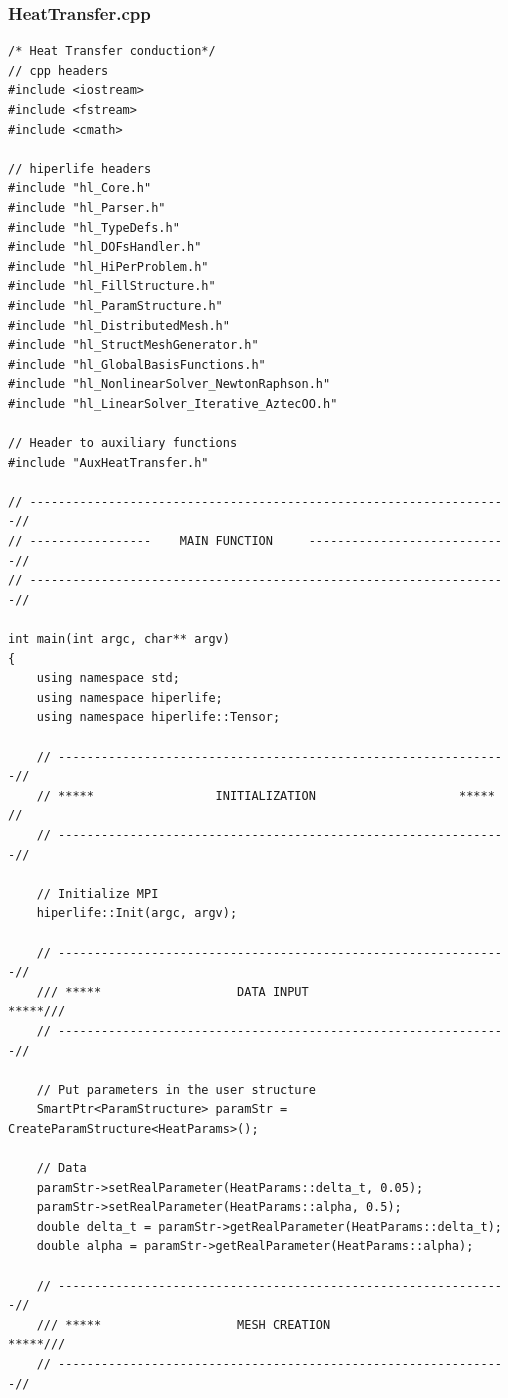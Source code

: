 \documentclass[]{article}
\begin{document}
\subsubsection{HeatTransfer.cpp} \label{sec: m.cpp}
\nolinenumbers
\begin{lstlisting}
/* Heat Transfer conduction*/
// cpp headers
#include <iostream>
#include <fstream>
#include <cmath>
	
// hiperlife headers
#include "hl_Core.h"
#include "hl_Parser.h"
#include "hl_TypeDefs.h"  
#include "hl_DOFsHandler.h"
#include "hl_HiPerProblem.h"
#include "hl_FillStructure.h"
#include "hl_ParamStructure.h"
#include "hl_DistributedMesh.h" 
#include "hl_StructMeshGenerator.h" 
#include "hl_GlobalBasisFunctions.h"
#include "hl_NonlinearSolver_NewtonRaphson.h"
#include "hl_LinearSolver_Iterative_AztecOO.h"
	
// Header to auxiliary functions
#include "AuxHeatTransfer.h"
	
// -------------------------------------------------------------------//
// -----------------    MAIN FUNCTION     ----------------------------//
// -------------------------------------------------------------------//
	
int main(int argc, char** argv)
{
	using namespace std;
	using namespace hiperlife;
	using namespace hiperlife::Tensor;
		
	// ---------------------------------------------------------------//
	// *****                 INITIALIZATION                    *****  //
	// ---------------------------------------------------------------//
		
	// Initialize MPI
	hiperlife::Init(argc, argv);
		
	// ---------------------------------------------------------------//
	/// *****                   DATA INPUT                      *****///
	// ---------------------------------------------------------------//
		
	// Put parameters in the user structure
	SmartPtr<ParamStructure> paramStr = CreateParamStructure<HeatParams>();
		
	// Data
	paramStr->setRealParameter(HeatParams::delta_t, 0.05);
	paramStr->setRealParameter(HeatParams::alpha, 0.5);
	double delta_t = paramStr->getRealParameter(HeatParams::delta_t);
	double alpha = paramStr->getRealParameter(HeatParams::alpha);
		
	// ---------------------------------------------------------------//
	/// *****                   MESH CREATION                   *****///
	// ---------------------------------------------------------------//
		

\end{lstlisting}
\end{document}
